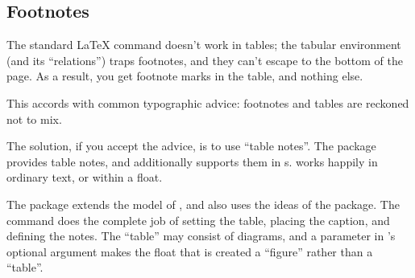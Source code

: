 \subsection{Footnotes}


The standard \LaTeX{}  command doesn't work in tables;
the tabular environment (and its ``relations'') traps footnotes, and
they can't escape to the bottom of the page.  As a result, you get
footnote marks in the table, and nothing else.

This accords with common typographic advice: footnotes and tables are
reckoned not to mix.

The solution, if you accept the advice, is to use ``table notes''.
The package  provides table notes, and
 additionally supports them in
s.   works happily in
ordinary text, or within a  float. 

The  package extends the model of
, and also uses the ideas of the
 package.  The  command does the complete
job of setting the table, placing the caption, and defining the
notes.  The ``table'' may consist of diagrams, and a parameter in
's optional argument makes the float that is created a
``figure'' rather than a ``table''.

